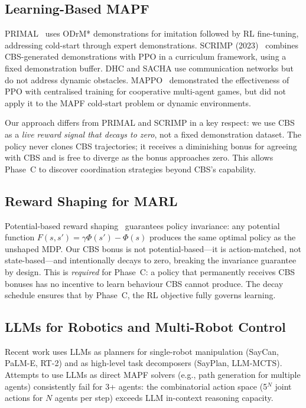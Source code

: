 \documentclass[letterpaper,twocolumn,10pt]{article}
\begin{document}
\subsection{Learning-Based MAPF}

PRIMAL~\cite{sartoretti2019primal} uses ODrM* demonstrations for imitation followed
by RL fine-tuning, addressing cold-start through expert demonstrations. SCRIMP
(2023)~\cite{scrimp2023} combines CBS-generated demonstrations with PPO in a curriculum
framework, using a fixed demonstration buffer. DHC and SACHA use communication
networks but do not address dynamic obstacles. MAPPO~\cite{yu2022mappo} demonstrated
the effectiveness of PPO with centralised training for cooperative multi-agent games,
but did not apply it to the MAPF cold-start problem or dynamic environments.

Our approach differs from PRIMAL and SCRIMP in a key respect: we use CBS as a
\emph{live reward signal that decays to zero}, not a fixed demonstration dataset.
The policy never clones CBS trajectories; it receives a diminishing bonus for
agreeing with CBS and is free to diverge as the bonus approaches zero. This allows
Phase~C to discover coordination strategies beyond CBS's capability.

\subsection{Reward Shaping for MARL}

Potential-based reward shaping~\cite{ng1999rewardshaping} guarantees policy invariance:
any potential function $F(s, s') = \gamma\Phi(s') - \Phi(s)$ produces the same
optimal policy as the unshaped MDP. Our CBS bonus is not potential-based---it is
action-matched, not state-based---and intentionally decays to zero, breaking the
invariance guarantee by design. This is \emph{required} for Phase~C: a policy that
permanently receives CBS bonuses has no incentive to learn behaviour CBS cannot produce.
The decay schedule ensures that by Phase~C, the RL objective fully governs learning.

\subsection{LLMs for Robotics and Multi-Robot Control}

Recent work uses LLMs as planners for single-robot manipulation
(SayCan, PaLM-E, RT-2) and as high-level task decomposers (SayPlan, LLM-MCTS).
Attempts to use LLMs as direct MAPF solvers (e.g., path generation for multiple
agents) consistently fail for 3+ agents: the combinatorial action space
(5$^N$ joint actions for $N$ agents per step) exceeds LLM in-context reasoning capacity.
\end{document}
